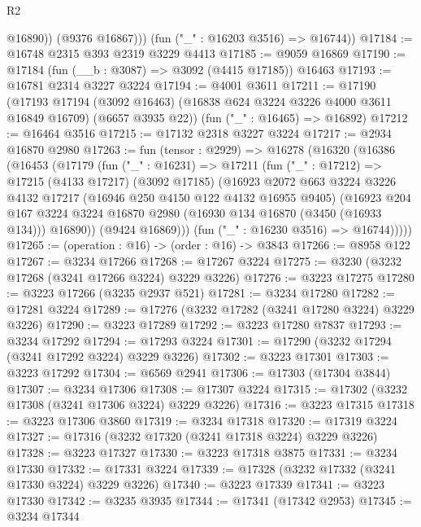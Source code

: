 \begin{lexlean}{R2}
\begin{coremodule}
              @16890))
          (@9376 @16867)))
      (fun ("_" : @16203 @3516) => @16744))
@17184 := @16748 @2315 @393 @2319 @3229 @4413
@17185 := @9059 @16869
@17190 := @17184 (fun (__b : @3087) => @3092 (@4415 @17185)) @16463
@17193 := @16781 @2314 @3227 @3224
@17194 := @4001 @3611
@17211 := @17190
    (@17193
      @17194
      (@3092 @16463)
      (@16838 @624 @3224 @3226 @4000 @3611 @16849 @16709)
      (@6657 @3935 @22))
    (fun ("_" : @16465) => @16892)
@17212 := @16464 @3516
@17215 := @17132 @2318 @3227 @3224
@17217 := @2934 @16870 @2980
@17263 := fun (tensor : @2929) =>
  @16278
    (@16320
      (@16386
        (@16453
          (@17179
            (fun ("_" : @16231) =>
            @17211
              (fun ("_" : @17212) =>
              @17215
                (@4133 @17217)
                (@3092 @17185)
                (@16923
                  @2072
                  @663
                  @3224
                  @3226
                  @4132
                  @17217
                  (@16946 @250 @4150 @122 @4132 @16955 @9405)
                  (@16923
                    @204
                    @167
                    @3224
                    @3224
                    @16870
                    @2980
                    (@16930 @134 @16870 (@3450 (@16933 @134)))
                    @16890))
                (@9424 @16869)))
            (fun ("_" : @16230 @3516) => @16744)))))
@17265 := (operation : @16) -> (order : @16) -> @3843
@17266 := @8958 @122
@17267 := @3234 @17266
@17268 := @17267 @3224
@17275 := @3230 (@3232 @17268 (@3241 @17266 @3224) @3229 @3226)
@17276 := @3223 @17275
@17280 := @3223 @17266 (@3235 @2937 @521)
@17281 := @3234 @17280
@17282 := @17281 @3224
@17289 := @17276 (@3232 @17282 (@3241 @17280 @3224) @3229 @3226)
@17290 := @3223 @17289
@17292 := @3223 @17280 @7837
@17293 := @3234 @17292
@17294 := @17293 @3224
@17301 := @17290 (@3232 @17294 (@3241 @17292 @3224) @3229 @3226)
@17302 := @3223 @17301
@17303 := @3223 @17292
@17304 := @6569 @2941
@17306 := @17303 (@17304 @3844)
@17307 := @3234 @17306
@17308 := @17307 @3224
@17315 := @17302 (@3232 @17308 (@3241 @17306 @3224) @3229 @3226)
@17316 := @3223 @17315
@17318 := @3223 @17306 @3860
@17319 := @3234 @17318
@17320 := @17319 @3224
@17327 := @17316 (@3232 @17320 (@3241 @17318 @3224) @3229 @3226)
@17328 := @3223 @17327
@17330 := @3223 @17318 @3875
@17331 := @3234 @17330
@17332 := @17331 @3224
@17339 := @17328 (@3232 @17332 (@3241 @17330 @3224) @3229 @3226)
@17340 := @3223 @17339
@17341 := @3223 @17330
@17342 := @3235 @3935
@17344 := @17341 (@17342 @2953)
@17345 := @3234 @17344

\end{coremodule}
\end{lexlean}
